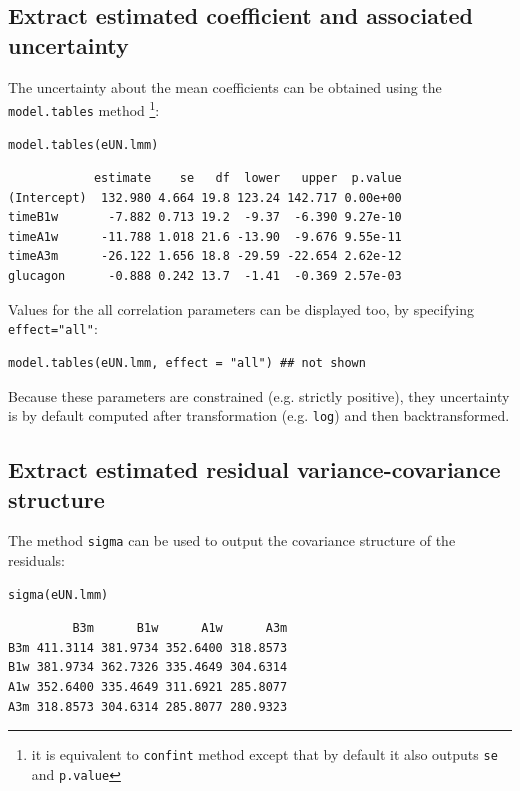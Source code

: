 \documentclass[12pt]{article}
\begin{document}
\subsection{Extract estimated coefficient and associated uncertainty}
\label{sec:orgb5f5431}

The uncertainty about the mean coefficients can be obtained using the
\texttt{model.tables} method \footnote{it is equivalent to \texttt{confint} method
except that by default it also outputs \texttt{se} and \texttt{p.value}}:
\lstset{language=r,label= ,caption= ,captionpos=b,numbers=none}
\begin{lstlisting}
model.tables(eUN.lmm)
\end{lstlisting}

\begin{verbatim}
            estimate    se   df  lower   upper  p.value
(Intercept)  132.980 4.664 19.8 123.24 142.717 0.00e+00
timeB1w       -7.882 0.713 19.2  -9.37  -6.390 9.27e-10
timeA1w      -11.788 1.018 21.6 -13.90  -9.676 9.55e-11
timeA3m      -26.122 1.656 18.8 -29.59 -22.654 2.62e-12
glucagon      -0.888 0.242 13.7  -1.41  -0.369 2.57e-03
\end{verbatim}


Values for the all correlation parameters can be displayed
too, by specifying \texttt{effect="all"}:
\lstset{language=r,label= ,caption= ,captionpos=b,numbers=none}
\begin{lstlisting}
model.tables(eUN.lmm, effect = "all") ## not shown
\end{lstlisting}

Because these parameters are constrained (e.g. strictly positive),
they uncertainty is by default computed after transformation
(e.g. \texttt{log}) and then backtransformed. 

\subsection{Extract estimated residual variance-covariance structure}
\label{sec:orgcfbdcde}

The method \texttt{sigma} can be used to output the covariance structure of the residuals:
\lstset{language=r,label= ,caption= ,captionpos=b,numbers=none}
\begin{lstlisting}
sigma(eUN.lmm)
\end{lstlisting}

\begin{verbatim}
         B3m      B1w      A1w      A3m
B3m 411.3114 381.9734 352.6400 318.8573
B1w 381.9734 362.7326 335.4649 304.6314
A1w 352.6400 335.4649 311.6921 285.8077
A3m 318.8573 304.6314 285.8077 280.9323
\end{verbatim}
\end{document}
